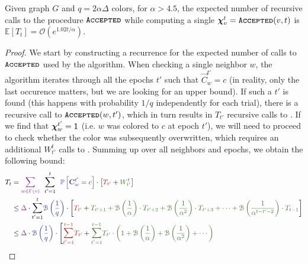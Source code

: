 \begin{lemma}
\label{lem:coloring_recurrence}
Given graph $G$ and $q=2\alpha\Delta$ colors, for $\alpha > 4.5$, the expected number of recursive calls to the procedure $\texttt{\textsc{Accepted}}$
while computing a single $\bm\chi^t_v = \texttt{\textsc{Accepted}}(v,t)$ is $\mathbb E[T_t] = \mathcal{O}\left(e^{1.02t/\alpha}\right)$.
\end{lemma}
\begin{proof}
We start by constructing a recurrence for the expected number of calls to $\texttt{\textsc{Accepted}}$ used by the algorithm.
When checking a single neighbor $w$, the algorithm iterates through all the epochs $t'$ such that $\vec C^{t'}_w = c$
(in reality, only the last occurence matters, but we are looking for an upper bound).
If such a $t'$ is found (this happens with probability $1/q$ independently for each trial), there is a recursive call to $\texttt{\textsc{Accepted}}(w,t')$,
which in turn results in $T_{t'}$ recursive calls to .
If we find that $\bm\chi^{t'}_w = \mathsf{1}$ (i.e. $w$ was colored to $c$ at epoch $t'$),
we will need to proceed to check whether the color was subsequently overwritten, which requires an additional $W^t_{t'}$ calls to .
Summing up over all neighbors and epochs, we obtain the following bound:
\begin{align}
T_{t} &= \textcolor{Fuchsia}{\mathlarger\sum\limits_{w\in \Gamma(v)}}\ \
\mathlarger\sum\limits_{t'=1}^{t}\ \  \textcolor{Blue}{\mathbb P\left[\vec C^{t'}_w = c\right]}\cdot
\left[ \textcolor{BrickRed}{T_{t'}} + \textcolor{OliveGreen!80!black}{W^t_{t'}} \right] \\
&\le \textcolor{Fuchsia}{\Delta} \cdot \mathlarger\sum\limits_{t'=1}^{t} \textcolor{Blue}{\mathcal B\left( \frac 1q\right)}\cdot
\left[ \textcolor{BrickRed}{T_{t'}} +
\textcolor{OliveGreen!80!black}{T_{t'+1} + \mathcal B\left(\frac{1}{\alpha}\right)\cdot T_{t'+2} +
\mathcal B\left(\frac{1}{\alpha^2}\right)\cdot T_{t'+3}
+ \cdots + \mathcal B\left(\frac{1}{\alpha^{t-t'-2}}\right)\cdot T_{t-1}} \right]\\
&\le \textcolor{Fuchsia}{\Delta} \cdot \textcolor{Blue}{\mathcal B\left( \frac{1}{q}\right)} \cdot \Biggl[
\textcolor{BrickRed}{\mathlarger\sum\limits_{t'=1}^{t-1} T_{t'}} +
\textcolor{OliveGreen!80!black}{\mathlarger\sum\limits_{t'=1}^{t-1} T_{t'}\cdot
\left(1 + \mathcal B\left(\frac1\alpha\right) + \mathcal B\left(\frac1{\alpha^2}\right) + \cdots\right)}

\end{align}
\end{proof}
